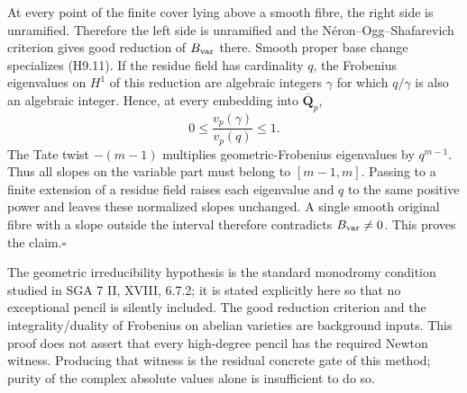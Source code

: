 At every point of the finite cover lying above a smooth fibre, the
right side is unramified. Therefore the left side is unramified and
the N\'eron--Ogg--Shafarevich criterion gives good reduction of
$B_{\rm var}$ there. Smooth proper base change specializes (H9.11).
If the residue field has cardinality $q$, the Frobenius eigenvalues on
$H^1$ of this reduction are algebraic integers $\gamma$ for which
$q/\gamma$ is also an algebraic integer. Hence, at every embedding into
$\overline{\mathbf Q}_p$,
\[
 0\leq\frac{v_p(\gamma)}{v_p(q)}\leq1.
\]
The Tate twist $-(m-1)$ multiplies geometric-Frobenius eigenvalues by
$q^{m-1}$. Thus all slopes on the variable part must belong to
$[m-1,m]$. Passing to a finite extension of a residue field raises
each eigenvalue and $q$ to the same positive power and leaves these
normalized slopes unchanged. A single smooth original fibre with a
slope outside the interval therefore contradicts $B_{\rm var}\ne0$.
This proves the claim.\hfill$\square$

The geometric irreducibility hypothesis is the standard monodromy
condition studied in SGA 7 II, XVIII, 6.7.2; it is stated explicitly
here so that no exceptional pencil is silently included. The good
reduction criterion and the integrality/duality of Frobenius on abelian
varieties are background inputs. This proof does not assert that every
high-degree pencil has the required Newton witness. Producing that
witness is the residual concrete gate of this method; purity of the
complex absolute values alone is insufficient to do so.
